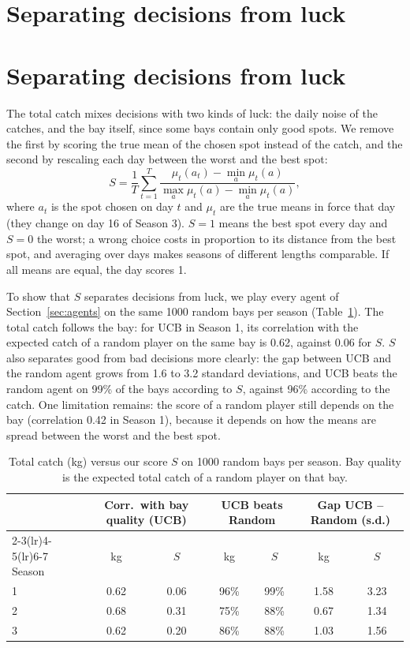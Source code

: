 \documentclass[11pt,a4paper]{article}
\begin{document}
\section{Separating decisions from luck}   %
\label{sec:measure}
\section{Separating decisions from luck}
\label{sec:measure}

The total catch mixes decisions with two kinds of luck: the daily noise of the
catches, and the bay itself, since some bays contain only good spots. We remove
the first by scoring the true mean of the chosen spot instead of the catch, and
the second by rescaling each day between the worst and the best spot:
\begin{equation}
  S = \frac{1}{T} \sum_{t=1}^{T}
      \frac{\mu_t(a_t) - \min_a \mu_t(a)}{\max_a \mu_t(a) - \min_a \mu_t(a)},
\end{equation}
where $a_t$ is the spot chosen on day $t$ and $\mu_t$ are the true means in
force that day (they change on day 16 of Season 3). $S=1$ means the best spot
every day and $S=0$ the worst; a wrong choice costs in proportion to its
distance from the best spot, and averaging over days makes seasons of different
lengths comparable. If all means are equal, the day scores 1.

To show that $S$ separates decisions from luck, we play every agent of
Section~\ref{sec:agents} on the same 1000 random bays per season
(Table~\ref{tab:measure}). The total catch follows the bay: for UCB in Season 1,
its correlation with the expected catch of a random player on the same bay is
0.62, against 0.06 for $S$. $S$ also separates good from bad decisions more
clearly: the gap between UCB and the random agent grows from 1.6 to 3.2
standard deviations, and UCB beats the random agent on 99\% of the bays
according to $S$, against 96\% according to the catch. One limitation remains:
the score of a random player still depends on the bay (correlation 0.42 in
Season 1), because it depends on how the means are spread between the worst and
the best spot.

\begin{table}[t]
\centering
\small
\begin{tabular}{lcccccc}
\toprule
 & \multicolumn{2}{c}{Corr.\ with bay quality (UCB)}
 & \multicolumn{2}{c}{UCB beats Random}
 & \multicolumn{2}{c}{Gap UCB -- Random (s.d.)} \\
\cmidrule(lr){2-3}\cmidrule(lr){4-5}\cmidrule(lr){6-7}
Season & kg & $S$ & kg & $S$ & kg & $S$ \\
\midrule
1 & 0.62 & 0.06 & 96\% & 99\% & 1.58 & 3.23 \\
2 & 0.68 & 0.31 & 75\% & 88\% & 0.67 & 1.34 \\
3 & 0.62 & 0.20 & 86\% & 88\% & 1.03 & 1.56 \\
\bottomrule
\end{tabular}
\caption{Total catch (kg) versus our score $S$ on 1000 random bays per season.
Bay quality is the expected total catch of a random player on that bay.}
\label{tab:measure}
\end{table}
\end{document}
